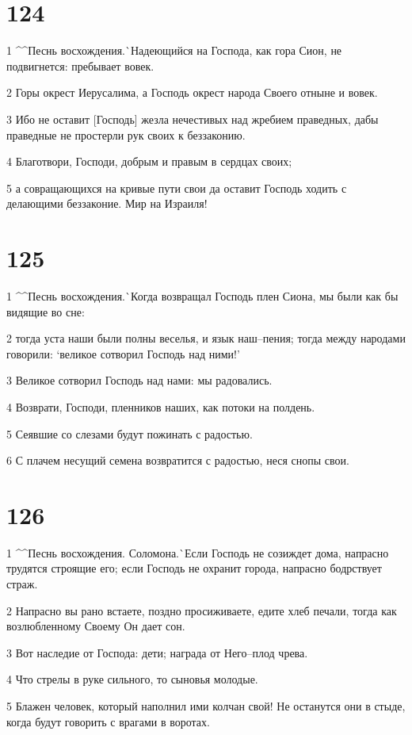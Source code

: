 \chapter{124}

\par 1 ^^Песнь восхождения.^^ Надеющийся на Господа, как гора Сион, не подвигнется: пребывает вовек.
\par 2 Горы окрест Иерусалима, а Господь окрест народа Своего отныне и вовек.
\par 3 Ибо не оставит [Господь] жезла нечестивых над жребием праведных, дабы праведные не простерли рук своих к беззаконию.
\par 4 Благотвори, Господи, добрым и правым в сердцах своих;
\par 5 а совращающихся на кривые пути свои да оставит Господь ходить с делающими беззаконие. Мир на Израиля!

\chapter{125}

\par 1 ^^Песнь восхождения.^^ Когда возвращал Господь плен Сиона, мы были как бы видящие во сне:
\par 2 тогда уста наши были полны веселья, и язык наш--пения; тогда между народами говорили: `великое сотворил Господь над ними!'
\par 3 Великое сотворил Господь над нами: мы радовались.
\par 4 Возврати, Господи, пленников наших, как потоки на полдень.
\par 5 Сеявшие со слезами будут пожинать с радостью.
\par 6 С плачем несущий семена возвратится с радостью, неся снопы свои.

\chapter{126}

\par 1 ^^Песнь восхождения. Соломона.^^ Если Господь не созиждет дома, напрасно трудятся строящие его; если Господь не охранит города, напрасно бодрствует страж.
\par 2 Напрасно вы рано встаете, поздно просиживаете, едите хлеб печали, тогда как возлюбленному Своему Он дает сон.
\par 3 Вот наследие от Господа: дети; награда от Него--плод чрева.
\par 4 Что стрелы в руке сильного, то сыновья молодые.
\par 5 Блажен человек, который наполнил ими колчан свой! Не останутся они в стыде, когда будут говорить с врагами в воротах.

